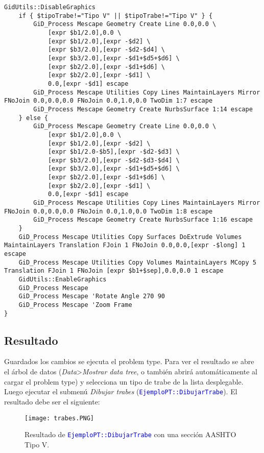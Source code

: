 \documentclass[10pt, a4paper, twocolumn]{article}
\begin{document}
\begin{lstlisting}[caption={Definición del procedimiento \texttt{EjemploPT::DibujarTrabe}}]
	GidUtils::DisableGraphics
	if { $tipoTrabe!="Tipo V" || $tipoTrabe!="Tipo V" } {
		GiD_Process Mescape Geometry Create Line 0.0,0.0 \
			[expr $b1/2.0],0.0 \
			[expr $b1/2.0],[expr -$d2] \
			[expr $b3/2.0],[expr -$d2-$d4] \
			[expr $b3/2.0],[expr -$d1+$d5+$d6] \
			[expr $b2/2.0],[expr -$d1+$d6] \
			[expr $b2/2.0],[expr -$d1] \
			0.0,[expr -$d1] escape
		GiD_Process Mescape Utilities Copy Lines MaintainLayers Mirror FNoJoin 0.0,0.0,0.0 FNoJoin 0.0,1.0,0.0 TwoDim 1:7 escape
		GiD_Process Mescape Geometry Create NurbsSurface 1:14 escape
	} else {
		GiD_Process Mescape Geometry Create Line 0.0,0.0 \
			[expr $b1/2.0],0.0 \
			[expr $b1/2.0],[expr -$d2] \
			[expr $b1/2.0-$b5],[expr -$d2-$d3] \
			[expr $b3/2.0],[expr -$d2-$d3-$d4] \
			[expr $b3/2.0],[expr -$d1+$d5+$d6] \
			[expr $b2/2.0],[expr -$d1+$d6] \
			[expr $b2/2.0],[expr -$d1] \
			0.0,[expr -$d1] escape
		GiD_Process Mescape Utilities Copy Lines MaintainLayers Mirror FNoJoin 0.0,0.0,0.0 FNoJoin 0.0,1.0,0.0 TwoDim 1:8 escape
		GiD_Process Mescape Geometry Create NurbsSurface 1:16 escape
	}
	GiD_Process Mescape Utilities Copy Surfaces DoExtrude Volumes MaintainLayers Translation FJoin 1 FNoJoin 0.0,0.0,[expr -$long] 1 escape
	GiD_Process Mescape Utilities Copy Volumes MaintainLayers MCopy 5 Translation FJoin 1 FNoJoin [expr $b1+$sep],0.0,0.0 1 escape
	GidUtils::EnableGraphics
	GiD_Process Mescape
	GiD_Process Mescape 'Rotate Angle 270 90
	GiD_Process Mescape 'Zoom Frame
}
\end{lstlisting}

\subsection{Resultado}

Guardados los cambios se ejecuta el problem type. Para ver el resultado se abre el árbol de datos (\textit{Data}>\textit{Mostrar data tree}, o también abrirá automáticamente al cargar el problem type) y selecciona un tipo de trabe de la lista desplegable. Luego ejecutar el submenú \textit{Dibujar trabes} (\textcolor{blue}{\texttt{EjemploPT::DibujarTrabe}}). El resultado debe ser el siguiente:

\begin{figure}[hbt!]\centering
	\texttt{[image: trabes.PNG]}
	\caption{Resultado de \textcolor{blue}{\texttt{EjemploPT::DibujarTrabe}} con una sección AASHTO Tipo V.\label{fig:resultadotrabes}}
\end{figure}

\end{document}
